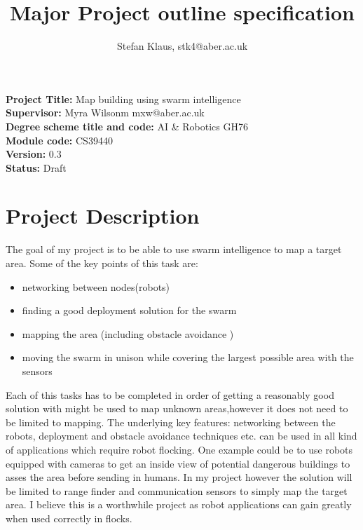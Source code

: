 \documentclass[10pt,a4paper]{article}
\author{Stefan Klaus, stk4@aber.ac.uk}
\title{Major Project outline specification }
\begin{document}

\maketitle
\begin{flushleft}
\textbf{Project Title:} Map building using swarm intelligence \\[3ex]
\textbf{Supervisor:} Myra Wilsonm mxw@aber.ac.uk\\[3ex]
\textbf{Degree scheme title and code:} AI \& Robotics GH76\\[3ex]
\textbf{Module code:} CS39440\\[3ex]
\textbf{Version:} 0.3\\[3ex]
\textbf{Status:} Draft\\

\newpage

\section{Project Description }
The goal of my project is to be able to use swarm intelligence to map a target area. Some of the key points of this task are:

\begin{itemize}
\item networking between nodes(robots)
\item finding a good deployment solution for the swarm
\item mapping the area (including obstacle avoidance )
\item moving the swarm in unison while covering the largest possible area with the sensors
\end{itemize}

Each of this tasks has to be completed in order of getting a reasonably good solution with might be used to map unknown areas,however it does not need to be limited to mapping. The underlying key features: networking between the robots, deployment and obstacle avoidance techniques etc. can be used in all kind of applications which require robot flocking. One example could be to use robots equipped with cameras to get an inside view of potential dangerous buildings to asses the area before sending in humans. In my project however the solution will be limited to range finder and communication sensors to simply map the target area. I believe this is a worthwhile project as robot applications can gain greatly when used correctly in flocks.\\[3ex]


\end{flushleft}
\end{document}
